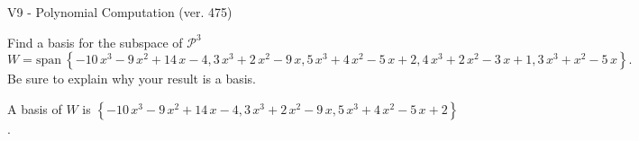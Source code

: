 \begin{exercise}
  \begin{exerciseTitle}V9 - Polynomial Computation (ver. 475)\end{exerciseTitle}
  \begin{exerciseStatement}
    Find a basis for the subspace of \(\mathcal{P}^3\) 
\[W=\mathrm{span}\ \left\{-10 \, x^{3} - 9 \, x^{2} + 14 \, x - 4 , 3 \, x^{3} + 2 \, x^{2} - 9 \, x , 5 \, x^{3} + 4 \, x^{2} - 5 \, x + 2 , 4 \, x^{3} + 2 \, x^{2} - 3 \, x + 1 , 3 \, x^{3} + x^{2} - 5 \, x\right\}.\]
 Be sure to explain why your result is a basis.


  \end{exerciseStatement}
  \begin{exerciseAnswer}
   A basis of \(W\) is  \(\left\{-10 \, x^{3} - 9 \, x^{2} + 14 \, x - 4 , 3 \, x^{3} + 2 \, x^{2} - 9 \, x , 5 \, x^{3} + 4 \, x^{2} - 5 \, x + 2\right\}\).
  


  \end{exerciseAnswer}
\end{exercise}